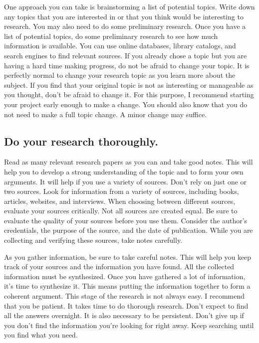\documentclass[
  b5paper]{book}
\begin{document}
One approach you can take is brainstorming a list of potential topics. Write down any topics that you are interested in or that you think would be interesting to research. You may also need to do some preliminary research. Once you have a list of potential topics, do some preliminary research to see how much information is available. You can use online databases, library catalogs, and search engines to find relevant sources. If you already chose a topic but you are having a hard time making progress, do not be afraid to change your topic. It is perfectly normal to change your research topic as you learn more about the subject. If you find that your original topic is not as interesting or manageable as you thought, don't be afraid to change it. For this purpose, I recommend starting your project early enough to make a change. You should also know that you do not need to make a full topic change. A minor change may suffice.

\hypertarget{do-your-research-thoroughly.}{%
\subsection*{Do your research thoroughly.}\label{do-your-research-thoroughly.}}

Read as many relevant research papers as you can and take good notes. This will help you to develop a strong understanding of the topic and to form your own arguments. It will help if you use a variety of sources. Don't rely on just one or two sources. Look for information from a variety of sources, including books, articles, websites, and interviews. When choosing between different sources, evaluate your sources critically. Not all sources are created equal. Be sure to evaluate the quality of your sources before you use them. Consider the author's credentials, the purpose of the source, and the date of publication. While you are collecting and verifying these sources, take notes carefully.

As you gather information, be sure to take careful notes. This will help you keep track of your sources and the information you have found. All the collected information must be synthesized. Once you have gathered a lot of information, it's time to synthesize it. This means putting the information together to form a coherent argument. This stage of the research is not always easy. I recommend that you be patient. It takes time to do thorough research. Don't expect to find all the answers overnight. It is also necessary to be persistent. Don't give up if you don't find the information you're looking for right away. Keep searching until you find what you need.
\end{document}
